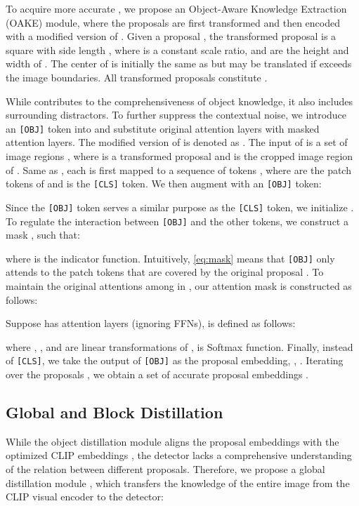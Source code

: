 \documentclass[10pt,twocolumn,letterpaper]{article}
\def\OAKE{Object-Aware Knowledge Extraction}
\begin{document}
To acquire more accurate , we propose an \OAKE{} (OAKE) module, where the proposals are first transformed and then encoded with a modified version of .
Given a proposal , the transformed proposal  is a square with side length , where  is a constant scale ratio,  and  are the height and width of .
The center of  is initially the same as  but may be translated if  exceeds the image boundaries.
All transformed proposals constitute .

While  contributes to the comprehensiveness of object knowledge, it also includes surrounding distractors.
To further suppress the contextual noise, we introduce an \texttt{[OBJ]} token into  and substitute original attention layers with masked attention layers.
The modified version of  is denoted as .
The input of  is a set of image regions , where  is a transformed proposal and  is the cropped image region of .
Same as , each  is first mapped to a sequence of tokens , where  are the patch tokens of  and  is the \texttt{[CLS]} token.
We then augment  with an \texttt{[OBJ]} token:

Since the \texttt{[OBJ]} token serves a similar purpose as the \texttt{[CLS]} token, we initialize .
To regulate the interaction between \texttt{[OBJ]} and the other tokens, we construct a mask , such that:

where  is the indicator function.
Intuitively, \cref{eq:mask} means that \texttt{[OBJ]} only attends to the patch tokens that are covered by the original proposal .
To maintain the original attentions among  in , our attention mask  is constructed as follows:


Suppose  has  attention layers (ignoring FFNs),  is defined as follows:

where , , and  are linear transformations of ,  is Softmax function.
Finally, instead of \texttt{[CLS]}, we take the output of \texttt{[OBJ]} as the proposal embedding, \ie, .
Iterating over the proposals , we obtain a set of accurate proposal embeddings .
 
\subsection{Global and Block Distillation}
\label{sec:global_and_block_distillation}

While the object distillation module  aligns the proposal embeddings  with the optimized CLIP embeddings , the detector lacks a comprehensive understanding of the relation between different proposals.
Therefore, we propose a global distillation module , which transfers the knowledge of the entire image from the CLIP visual encoder  to the detector:
\end{document}
